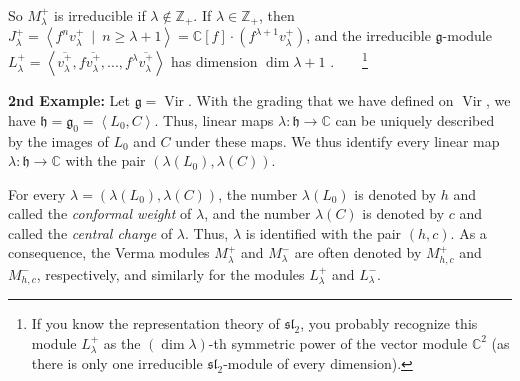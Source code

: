 \documentclass
[numbers=enddot,12pt,final,onecolumn,german,notitlepage]{scrartcl}%
\theoremstyle{definition}
\begin{document}
So $M_{\lambda}^{+}$ is irreducible if $\lambda\notin\mathbb{Z}_{+}$. If
$\lambda\in\mathbb{Z}_{+}$, then $J_{\lambda}^{+}=\left\langle f^{n}%
v_{\lambda}^{+}\ \mid\ n\geq\lambda+1\right\rangle =\mathbb{C}\left[
f\right]  \cdot\left(  f^{\lambda+1}v_{\lambda}^{+}\right)  $, and the
irreducible $\mathfrak{g}$-module $L_{\lambda}^{+}=\left\langle \overline
{v_{\lambda}^{+}},f\overline{v_{\lambda}^{+}},...,f^{\lambda}\overline
{v_{\lambda}^{+}}\right\rangle $ has dimension $\dim\lambda+1$%
.\ \ \ \ \footnote{If you know the representation theory of $\mathfrak{sl}%
_{2}$, you probably recognize this module $L_{\lambda}^{+}$ as the $\left(
\dim\lambda\right)  $-th symmetric power of the vector module $\mathbb{C}^{2}$
(as there is only one irreducible $\mathfrak{sl}_{2}$-module of every
dimension).}

\textbf{2nd Example:} Let $\mathfrak{g}=\operatorname*{Vir}$. With the grading
that we have defined on $\operatorname*{Vir}$, we have $\mathfrak{h}%
=\mathfrak{g}_{0}=\left\langle L_{0},C\right\rangle $. Thus, linear maps
$\lambda:\mathfrak{h}\rightarrow\mathbb{C}$ can be uniquely described by the
images of $L_{0}$ and $C$ under these maps. We thus identify every linear map
$\lambda:\mathfrak{h}\rightarrow\mathbb{C}$ with the pair $\left(
\lambda\left(  L_{0}\right)  ,\lambda\left(  C\right)  \right)  $.

For every $\lambda=\left(  \lambda\left(  L_{0}\right)  ,\lambda\left(
C\right)  \right)  $, the number $\lambda\left(  L_{0}\right)  $ is denoted by
$h$ and called the \textit{conformal weight} of $\lambda$, and the number
$\lambda\left(  C\right)  $ is denoted by $c$ and called the \textit{central
charge} of $\lambda$. Thus, $\lambda$ is identified with the pair $\left(
h,c\right)  $. As a consequence, the Verma modules $M_{\lambda}^{+}$ and
$M_{\lambda}^{-}$ are often denoted by $M_{h,c}^{+}$ and $M_{h,c}^{-}$,
respectively, and similarly for the modules $L_{\lambda}^{+}$ and $L_{\lambda
}^{-}$.
\end{document}
